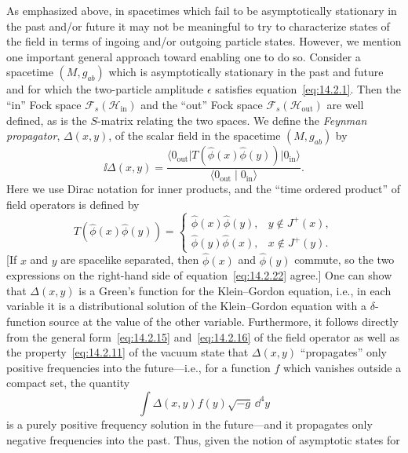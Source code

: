 As emphasized above, in spacetimes which fail to be asymptotically stationary in the
past and/or future it may not be meaningful to try to characterize states of the field
in terms of ingoing and/or outgoing particle states. However, we mention one
important general approach toward enabling one to do so. Consider a spacetime
\((M,g_{ab})\) which is asymptotically stationary in the past and future and for which
the two-particle amplitude \(\epsilon\) satisfies equation~\eqref{eq:14.2.1}. Then
the ``in'' Fock space \(\mathcal F_s(\mathcal H_{\mathrm{in}})\) and the ``out'' Fock
space \(\mathcal F_s(\mathcal H_{\mathrm{out}})\) are well defined, as is the
\(S\)-matrix relating the two spaces. We define the \emph{Feynman propagator},
\(\Delta(x,y)\), of the scalar field in the spacetime \((M,g_{ab})\) by
\begin{equation}
  \ii\Delta(x,y)
  =\frac{\langle0_{\mathrm{out}}\rvert
      T(\widehat\phi(x)\widehat\phi(y))
      \lvert0_{\mathrm{in}}\rangle}
    {\langle0_{\mathrm{out}}\mid0_{\mathrm{in}}\rangle}.
  \tag{14.2.21}\label{eq:14.2.21}
\end{equation}
Here we use Dirac notation for inner products, and the ``time ordered product'' of
field operators is defined by
\begin{equation}
  T(\widehat\phi(x)\widehat\phi(y))=
  \begin{cases}
    \widehat\phi(x)\widehat\phi(y), & y\notin J^+(x),\\
    \widehat\phi(y)\widehat\phi(x), & x\notin J^+(y).
  \end{cases}
  \tag{14.2.22}\label{eq:14.2.22}
\end{equation}
[If \(x\) and \(y\) are spacelike separated, then \(\widehat\phi(x)\) and
\(\widehat\phi(y)\) commute, so the two expressions on the right-hand side of
equation~\eqref{eq:14.2.22} agree.] One can show that \(\Delta(x,y)\) is a Green's
function for the Klein--Gordon equation, i.e., in each variable it is a distributional
solution of the Klein--Gordon equation with a \(\delta\)-function source at the value
of the other variable. Furthermore, it follows directly from the general
form~\eqref{eq:14.2.15} and~\eqref{eq:14.2.16} of the field operator as well as the
property~\eqref{eq:14.2.11} of the vacuum state that \(\Delta(x,y)\) ``propagates''
only positive frequencies into the future---i.e., for a function \(f\) which vanishes
outside a compact set, the quantity
\[
  \int\Delta(x,y)f(y)\sqrt{-g}\,\dd^4y
\]
is a purely positive frequency solution in the future---and it propagates only
negative frequencies into the past. Thus, given the notion of asymptotic states for
